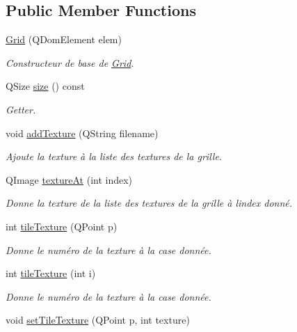 \subsection*{Public Member Functions}
\begin{DoxyCompactItemize}
\item 
\hyperlink{class_grid_ac9920f1d5b87c3b528fdfc1f73011b4e}{Grid} (Q\+Dom\+Element elem)
\begin{DoxyCompactList}\small\item\em Constructeur de base de \hyperlink{class_grid}{Grid}. \end{DoxyCompactList}\item 
Q\+Size \hyperlink{class_grid_aa79281119d2e4644d53c9fba286b5dad}{size} () const 
\begin{DoxyCompactList}\small\item\em Getter. \end{DoxyCompactList}\item 
void \hyperlink{class_grid_ad7b1701e7ba881746363ad87aee5c879}{add\+Texture} (Q\+String filename)
\begin{DoxyCompactList}\small\item\em Ajoute la texture à la liste des textures de la grille. \end{DoxyCompactList}\item 
Q\+Image \hyperlink{class_grid_af8b6eb68deccf4cf8d9375ba52923599}{texture\+At} (int index)
\begin{DoxyCompactList}\small\item\em Donne la texture de la liste des textures de la grille à l\textquotesingle{}index donné. \end{DoxyCompactList}\item 
int \hyperlink{class_grid_aeb52c62fd156c4169463d3f6cff8208e}{tile\+Texture} (Q\+Point p)
\begin{DoxyCompactList}\small\item\em Donne le numéro de la texture à la case donnée. \end{DoxyCompactList}\item 
int \hyperlink{class_grid_af6f09b36ec823d16065f2f8c997ba071}{tile\+Texture} (int i)
\begin{DoxyCompactList}\small\item\em Donne le numéro de la texture à la case donnée. \end{DoxyCompactList}\item 
void \hyperlink{class_grid_abf2e8bc6fe111e3228fea6a496befc16}{set\+Tile\+Texture} (Q\+Point p, int texture)

\end{DoxyCompactItemize}
